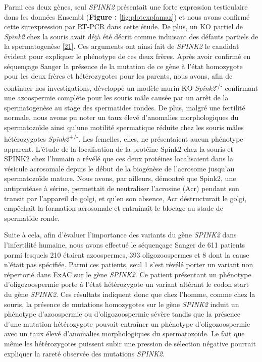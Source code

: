 \documentclass[12pt,a4paper,twoside]{ugathesis}
\begin{document}
Parmi ces deux gènes, seul \emph{SPINK2} présentait une forte expression
testiculaire dans les données Ensembl (\textbf{Figure :
}\ref{fig:plotexpfamaz}) et nous avons confirmé cette surexpression par
RT-PCR dans cette étude. De plus, un KO partiel de \emph{Spink2} chez la
souris avait déjà été décrit comme induisant des défauts partiels de la
spermatogenèse {[}\protect\hyperlink{ref-Lee2011}{21}{]}. Ces arguments
ont ainsi fait de \emph{SPINK2} le candidat évident pour expliquer le
phénotype de ces deux frères. Après avoir confirmé en séquençage Sanger
la présence de la mutation de ce gène à l'état homozygote pour les deux
frères et hétérozygotes pour les parents, nous avons, afin de continuer
nos investigations, développé un modèle murin KO
\emph{Spink2}\textsuperscript{-/-} confirmant une azoospermie complète
pour les souris mâle causée par un arrêt de la spermatogenèse au stage
des spermatides rondes. De plus, malgré une fertilité normale, nous
avons pu noter un taux élevé d'anomalies morphologiques du spermatozoïde
ainsi qu'une motilité spermatique réduite chez les souris mâles
hétérozygotes \emph{Spink2}\textsuperscript{+/-}. Les femelles, elles,
ne présentaient aucun phénotype apparent. L'étude de la localisation de
la protéine Spink2 chez la souris et SPINK2 chez l'humain a révélé que
ces deux protéines localisaient dans la vésicule acrosomale depuis le
début de la biogénèse de l'acrosome jusqu'au spermatozoïde mature. Nous
avons, par ailleurs, démontré que Spink2, une antiprotéase à sérine,
permettait de neutraliser l'acrosine (Acr) pendant son transit par
l'appareil de golgi, et qu'en son absence, Acr déstructurait le golgi,
empêchait la formation acrosomale et entraînait le blocage au stade de
spermatide ronde.

Suite à cela, afin d'évaluer l'importance des variants du gène
\emph{SPINK2} dans l'infertilité humaine, nous avons effectué le
séquençage Sanger de 611 patients parmi lesquels 210 étaient
azoospermes, 393 oligozoospermes et 8 dont la cause n'était pas
spécifiée. Parmi ces patients, seul 1 s'est révélé porter un variant non
répertorié dans ExAC sur le gène \emph{SPINK2}. Ce patient présentant un
phénotype d'oligozoospermie porte à l'état hétérozygote un variant
altérant le codon start du gène \emph{SPINK2}. Ces résultats indiquent
donc que chez l'homme, comme chez la souris, la présence de mutations
homozygotes sur le gène \emph{SPINK2} induit un phénotype d'azoospermie
ou d'oligozoospermie sévère tandis que la présence d'une mutation
hétérozygote pouvait entraîner un phénotype d'oligozoospermie avec un
taux élevé d'anomalies morphologiques du spermatozoïde. Le fait que même
les hétérozygotes puissent subir une pression de sélection négative
pourrait expliquer la rareté observée des mutations \emph{SPINK2}.
\end{document}
